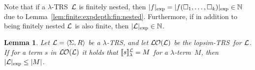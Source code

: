 \documentclass[
submission
]{dmtcs-episciences-tampered}
\newcommand{\fap}[2]{#1({#2})}
\newcommand{\iap}[2]{#1 _{#2}}
\newcommand{\indap}[2]{#1 _{#2}}
\newcommand{\nb}{\nobreakdash}
\newcommand{\nf}{\normalfont}
\newcommand{\tuple}[1]{\langle #1 \rangle}
\newcommand{\tuplespace}{\hspace*{0.5pt}}
\newcommand{\pair}[2]{\tuple{#1, \tuplespace #2}}
\newcommand{\nat}{\mathbb{N}}
\newcommand{\ater}{s}
\newcommand{\asig}{\Sigma}
\newcommand{\arules}{R}
\newcommand{\alTRS}{{\cal L}}
\newcommand{\TRS}{TRS}
\newcommand{\afoscopesym}{f}
\newcommand{\afoscope}{\fap{\afoscopesym}}
\newcommand{\hole}{\Box}
\newcommand{\holei}{\iap{\hole}}
\newcommand{\sdepth}{\text{\nf d}}
\newcommand{\depth}[1]{\lvert{#1}\rvert} \newcommand{\depthbig}[1]{\big\lvert{#1}\big\rvert} \newcommand{\sudepth}{\indap{\sdepth}{\text{\nf u}}}
\newcommand{\expdepth}[1]{\lvert{#1}\rvert_{\scriptexp}}
\newcommand{\denlterwrt}[2]{\llbracket{#2}\rrbracket^{#1}_{\sslabs}}
\newcommand{\lopsimTRS}{lopsim-TRS}
\newcommand{\alter}{M}
\newcommand{\sslabs}{\lambda}
\newcommand{\scriptexp}{\text{\nf exp}}
\newcommand{\lambdaterm}{$\lambda$\nb-term}
\newcommand{\lTRS}{$\lambda$\hspace*{-0.5pt}\nb-\hspace*{-0.5pt}\TRS}
\theoremstyle{plain}
\newtheorem{lemma}[theorem]{Lemma}
\theoremstyle{definition}
\begin{document}
Note that if a \lTRS~$\alTRS$ is finitely nested, then 
$\expdepth{\afoscopesym} = \expdepth{\afoscope{\holei{1},\ldots,\holei{k}}}\in\nat$ 
due to Lemma~\ref{lem:finite:expdepth:fin:nested}.
Furthermore, if in addition to being finitely nested 
$\alTRS$ is also finite, then $\expdepth{\alTRS} \in\nat$.






\begin{lemma}\label{lem:depth:losimTRS}
  Let $\alTRS = \pair{\asig}{\arules}$ be a \lTRS, 
  and let $\lopsimTRSwrt{\alTRS}$ be the \lopsimTRS\ for $\alTRS$. 
  If for a term $\ater$ in $\lopsimTRSwrt{\alTRS}$
  it holds that $\denlterwrt{\alTRS}{\ater} = \alter$ for a \lambdaterm~$\alter$,
  then 
  $\expdepth{\alTRS} \le \depth{\alter}$.   
\end{lemma}
\end{document}
